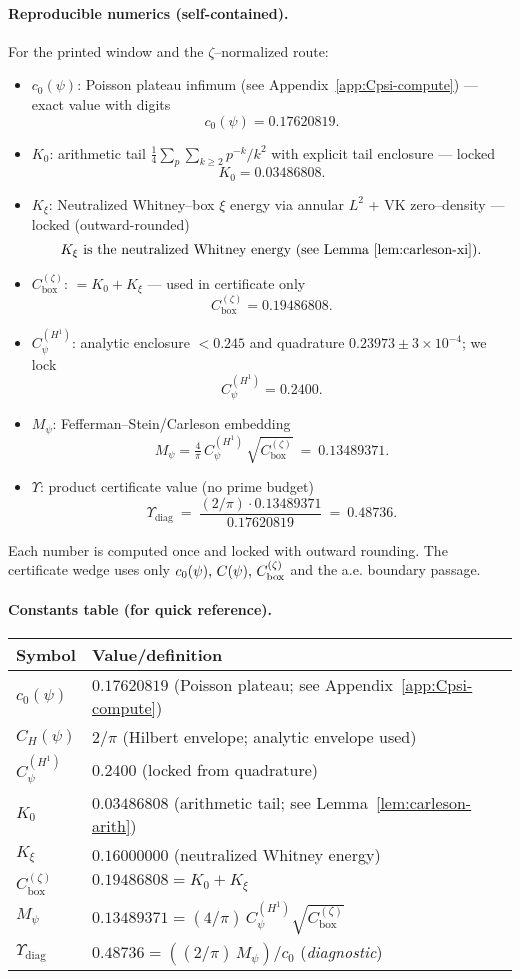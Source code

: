 \documentclass[11pt]{article}
\providecommand{\czeroplateau}{0.17620819}%
\providecommand{\Kxi}{K_\xi}
\providecommand{\CboxZeta}{K_0 + K_\xi}%
\providecommand{\CHone}{2/\pi}%
\providecommand{\CpsiHone}{0.2400}%
\providecommand{\Mpsilocked}{(4/\pi)\,\CpsiHone\,\sqrt{\CboxZeta}}
\providecommand{\UpsilonLocked}{(2/\pi)\,\Mpsilocked/\czeroplateau}%
\renewcommand{\Kxi}{0.16000000}
\renewcommand{\CboxZeta}{0.19486808}
\renewcommand{\Mpsilocked}{0.13489371}
\renewcommand{\UpsilonLocked}{0.48736}
\theoremstyle{definition}
\theoremstyle{remark}
\begin{document}
\paragraph{Reproducible numerics (self-contained).}
For the printed window and the \(\zeta\)–normalized route:
\begin{itemize}
\item \(c_0(\psi)\): Poisson plateau infimum (see Appendix~\ref{app:Cpsi-compute}) — exact value with digits
\[ c_0(\psi)=0.17620819. \]
\item \(K_0\): arithmetic tail \(\tfrac14\sum_{p}\sum_{k\ge2} p^{-k}/k^2\) with explicit tail enclosure — locked
\[ K_0=0.03486808. \]
\item \(K_\xi\): Neutralized Whitney–box \(\xi\) energy via annular $L^2$ + VK zero–density — locked (outward-rounded)
\[ K_\xi \text{ is the neutralized Whitney energy (see Lemma~\ref{lem:carleson-xi}).} \]
\item \(C_{\mathrm{box}}^{(\zeta)}\): $=K_0+K_\xi$ — used in certificate only
\[ C_{\mathrm{box}}^{(\zeta)}=\CboxZeta. \]
\item \(C_\psi^{(H^1)}\): analytic enclosure $<0.245$ and quadrature $0.23973\pm3\times10^{-4}$; we lock
\[ C_\psi^{(H^1)}=0.2400. \]
\item \(M_\psi\): Fefferman–Stein/Carleson embedding
\[ M_\psi=\tfrac{4}{\pi}\,C_\psi^{(H^1)}\,\sqrt{C_{\mathrm{box}}^{(\zeta)}}\ =\ \Mpsilocked. \]
\item \(\Upsilon\): product certificate value (no prime budget)
\[ \Upsilon_{\mathrm{diag}}\ =\ \frac{(2/\pi)\cdot \Mpsilocked}{0.17620819}\ =\ \UpsilonLocked. \]
\end{itemize}
Each number is computed once and locked with outward rounding. The certificate wedge uses only \(c_0(\psi),\,C(\psi),\,C_{\rm box}^{(\zeta)}\) and the a.e. boundary passage.
\paragraph{Constants table (for quick reference).}
\begin{center}
\begin{tabular}{ll}
\toprule
Symbol & Value/definition \\
\midrule
$c_0(\psi)$ & $\czeroplateau$ (Poisson plateau; see Appendix~\ref{app:Cpsi-compute}) \\
$C_H(\psi)$ & $\CHone$ (Hilbert envelope; analytic envelope used) \\
$C_\psi^{(H^1)}$ & $\CpsiHone$ (locked from quadrature) \\
$K_0$ & $0.03486808$ (arithmetic tail; see Lemma~\ref{lem:carleson-arith}) \\
$K_\xi$ & $\Kxi$ (neutralized Whitney energy) \\
$C_{\mathrm{box}}^{(\zeta)}$ & $\CboxZeta=K_0+K_\xi$ \\
$M_\psi$ & $\Mpsilocked=(4/\pi)\,C_\psi^{(H^1)}\sqrt{C_{\mathrm{box}}^{(\zeta)}}$ \\
\(\Upsilon_{\mathrm{diag}}\) & $\UpsilonLocked=((2/\pi)\,M_\psi)/c_0$ \quad(\emph{diagnostic})\\
\bottomrule
\end{tabular}
\end{center}
\end{document}
